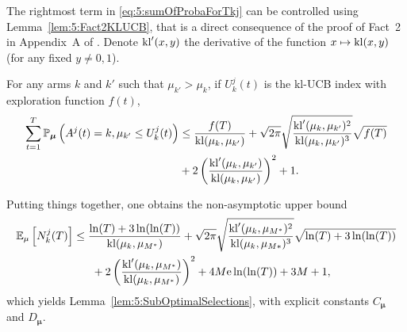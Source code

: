 \begin{smallproof}
  The rightmost term in \eqref{eq:5:sumOfProbaForTkj} can be controlled using Lemma~\ref{lem:5:Fact2KLUCB}, that is a direct consequence of the proof of Fact~2 in Appendix~A of \cite{KLUCBJournal}.
  Denote $\mathrm{kl}'(x,y)$ the derivative of the function $x \mapsto \mathrm{kl}(x,y)$ (for any fixed $y\neq 0, 1$).

  \begin{lemma}\label{lem:5:Fact2KLUCB}
  \begin{leftbar}[lemmabar]  %
    For any arms $k$ and $k'$ such that $\mu_{k'} > \mu_{k}$, if $U_k^{j}(t)$ is the kl-UCB index with exploration function $f(t)$,
      \begin{align}
        \sum_{t=1}^T\mathbb{P}_{\bm{\mu}} \left( A^j(t) = k, \mu_{k'} \leq U_k^{j}(t) \right)
        & \leq  \frac{f(T)}{\mathrm{kl}(\mu_k,\mu_{k'})}
        + \sqrt{2\pi} \sqrt{\frac{\mathrm{kl}'(\mu_k,\mu_{k'})^2}{\mathrm{kl}(\mu_k,\mu_{k'})^3}}\sqrt{f(T)} \nonumber\\
        & + 2\left(\frac{\mathrm{kl}'(\mu_k,\mu_{k'})}{\mathrm{kl}(\mu_k,\mu_{k'})}\right)^2 + 1.
      \end{align}
\end{leftbar}  %
\end{lemma}

  Putting things together, one obtains the non-asymptotic upper bound
  \begin{align}\label{eq:5:UBprecise}
    \mathbb{E}_{\mu}\left[N_k^j(T)\right]
    & \leq \frac{\ln(T) + 3 \ln(\ln(T))}{\mathrm{kl}(\mu_k,\mu_{M^*})} + \sqrt{2\pi} \sqrt{\frac{\mathrm{kl}'(\mu_k,\mu_{M^*})^2}{\mathrm{kl}(\mu_k,\mu_{M*})^3}}\sqrt{\ln(T) + 3\ln(\ln(T))}  \nonumber\\
    & \;\;\;\;\;\;+ 2\left(\frac{\mathrm{kl}'(\mu_k,\mu_{M^*})}{\mathrm{kl}(\mu_k,\mu_{M^*})}\right)^2 + 4M \mathrm{e} \ln(\ln(T)) + 3M+1,
  \end{align}
  which yields Lemma~\ref{lem:5:SubOptimalSelections},
  with explicit constants $C_{\boldsymbol{\mu}}$ and $D_{\boldsymbol{\mu}}$.
\end{smallproof}




